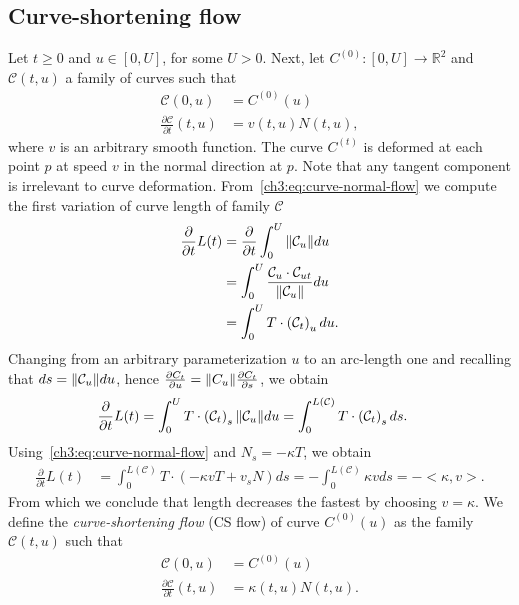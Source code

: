 \subsection{Curve-shortening flow}
\label{ch3:sec:curve-shortening-flow}

Let $ t\geq 0$ and $u \in [0,U]$, for some $U>0$. Next, let $C^{(0)}:[0,U] \rightarrow \mathbb{R}^2$ and $\mathcal{C}(t,u)$ a family of curves such that
\begin{align}
	\mathcal{C}(0,u) & = C^{(0)}(u) \\
	\frac{\partial \mathcal{C}}{\partial t}(t,u) &= v(t,u) N(t,u),
	\label{ch3:eq:curve-normal-flow}
\end{align}
%
where $v$ is an arbitrary smooth function. The curve ${C}^{(t)}$ is deformed at each point $p$ at speed $v$ in the normal direction at $p$. Note that any tangent component is irrelevant to curve deformation. From~\cref{ch3:eq:curve-normal-flow} we compute the first variation of curve length of family $\mathcal{C}$
\begin{align*}
	\frac{\partial }{\partial t}L(t) &= \frac{\partial}{\partial t}\int_{0}^{U}{\lVert \mathcal{C}_u \rVert du} \\
	&= \int_{0}^{U}{ \frac{ \mathcal{C}_u \cdot \mathcal{C}_{ut} }{\lVert\mathcal{C}_u\rVert } du} \\
	&= \int_{0}^{U}{ T \cdot \left( \mathcal{C}_{t} \right)_u  du}.
\end{align*}
%
Changing from an arbitrary parameterization $u$ to an arc-length one and recalling that $ds=\lVert \mathcal{C}_u \rVert  du$, hence $\frac{\partial C_t}{\partial u } =  \lVert C_u\rVert \frac{\partial C_t}{\partial s}$, we obtain
\begin{align*}
	\frac{\partial }{\partial t}L(t) &= \int_{0}^{U}{ T \cdot \left( \mathcal{C}_{t} \right)_s \lVert \mathcal{C}_u \rVert  du} = \int_{0}^{L(\mathcal{C})}{ T \cdot \left( \mathcal{C}_{t} \right)_s ds}. 	
\end{align*}
%
Using~\cref{ch3:eq:curve-normal-flow} and $N_s = -\kappa T$, we obtain
\begin{align*}
	\frac{\partial }{\partial t}L(t) &= \int_{0}^{L(\mathcal{C})}{T \cdot (-\kappa vT + v_sN) ds } = - \int_{0}^{L(\mathcal{C})}{\kappa v ds} = -<\kappa,v>.
\end{align*}
%
From which we conclude that length decreases the fastest by choosing $v=\kappa$. We define the \emph{curve-shortening flow} (CS flow) of curve $C^{(0)}(u)$ as the family $\mathcal{C}(t,u)$ such that
\begin{align}
	\mathcal{C}(0,u) & = C^{(0)}(u) \\
	\frac{\partial \mathcal{C}}{\partial t}(t,u) &= \kappa(t,u) N(t,u).
	\label{ch3:eq:curve-shortening-flow}
\end{align}
